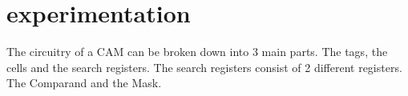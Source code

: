 \section{experimentation}
The circuitry of a CAM can be broken down into 3 main parts. The tags, the cells and the search registers. 
The search registers consist of 2 different registers. The Comparand and the Mask. 